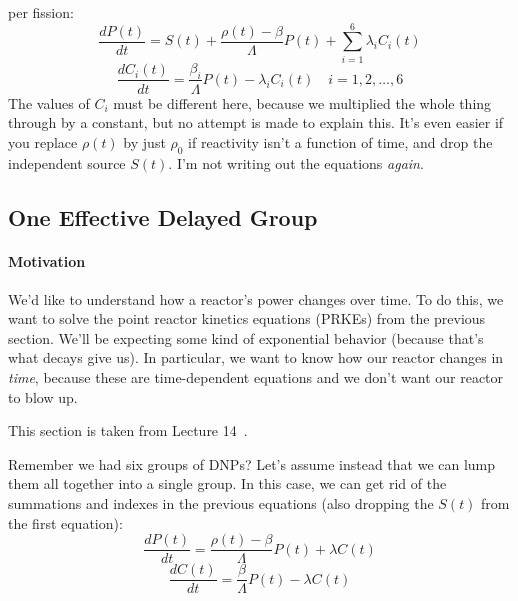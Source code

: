\documentclass[letter]{article}
\begin{document}
per fission:
\begin{equation*}
      \frac{dP(t)}{dt}= S(t) + \frac{\rho(t)-\beta}{\Lambda}P(t)+\sum^6_{i=1}\lambda_iC_i(t)
\end{equation*}
\begin{equation*}
    \frac{dC_i(t)}{dt}=\frac{\beta_i}{\Lambda}P(t)-\lambda_iC_i(t)\quad i=1,2,\ldots,6
\end{equation*}
The values of $C_i$ must be different here, because we multiplied the
whole thing through by a constant, but no attempt is made to explain
this. It's even easier if you replace $\rho(t)$ by just $\rho_0$ if
reactivity isn't a function of time, and drop the independent source
$S(t)$. I'm not writing out the equations \textit{again}.

\subsection{One Effective Delayed Group}

\paragraph{Motivation}

We'd like to understand how a reactor's power changes over time. To do
this, we want to solve the point reactor kinetics equations (PRKEs)
from the previous section. We'll be expecting some kind of exponential
behavior (because that's what decays give us). In particular, we want
to know how our reactor changes in \textit{time}, because these are
time-dependent equations and we don't want our reactor to blow up.

\vspace{10pt}
This section is taken from Lecture 14~\cite{lecture}.

\vspace{10pt}
Remember we had six groups of DNPs? Let's assume instead that we can
lump them all together into a single group. In this case, we can get
rid of the summations and indexes in the previous equations (also
dropping the $S(t)$ from the first equation):
\begin{equation*}
      \frac{dP(t)}{dt}= \frac{\rho(t)-\beta}{\Lambda}P(t)+\lambda{}C(t)
\end{equation*}
\begin{equation*}
    \frac{dC(t)}{dt}=\frac{\beta}{\Lambda}P(t)-\lambda{}C(t)
\end{equation*}
\end{document}
